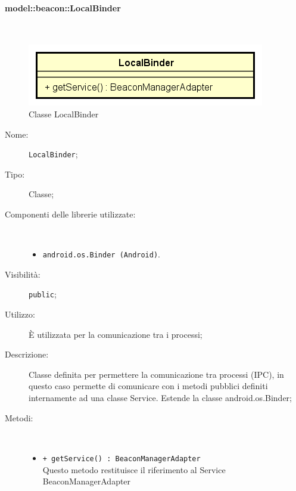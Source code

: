 \documentclass[../DefinizioneDiProdotto.tex]{subfiles}
\begin{document}
\paragraph{model::beacon::LocalBinder}
\
\begin{figure}[H]
	\centering
	\includegraphics[width=\maxwidth]{img/LocalBinder.png}
	\caption{Classe LocalBinder}\label{fig:model::beacon::LocalBinder} 
\end{figure}
\begin{description}
	\item[Nome:] \texttt{LocalBinder};
	\item[Tipo:] Classe;
	\item[Componenti delle librerie utilizzate:] \
	\begin{itemize}
		\item \texttt{android.os.Binder (Android)}.
		
	\end{itemize}
	\item[Visibilità:] \texttt{public};
	\item[Utilizzo:] È utilizzata per la comunicazione tra i processi;
	\item[Descrizione:] Classe definita per permettere la comunicazione tra processi (IPC), in questo caso permette di comunicare con i metodi pubblici definiti internamente ad una classe Service. Estende la classe android.os.Binder;
	\item[Metodi:] \
	\begin{itemize}
		\item \texttt{+ getService() : BeaconManagerAdapter}\\
		Questo metodo restituisce il riferimento al Service BeaconManagerAdapter
	\end{itemize}
\end{description}
\end{document}
